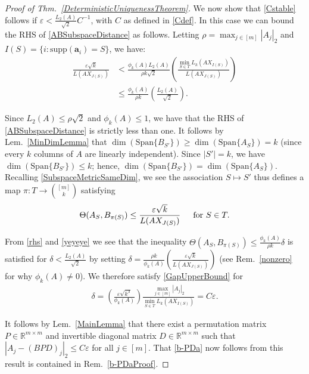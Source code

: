 \documentclass[journal, twocolumn]{IEEEtran}
\begin{document}
\begin{proof}[Proof of Thm.~\ref{DeterministicUniquenessTheorem}]
We now show that \eqref{Cstable} follows if $\varepsilon < \frac{L_2(A)}{\sqrt{2}}C^{-1}$, with $C$ as defined in \eqref{Cdef}. In this case we can bound the RHS of \eqref {ABSubspaceDistance} as follows. Letting $\rho = \max_{j \in [m]} |A_j|_2$ and $I(S) = \{i: \text{supp}(\mathbf{a}_i)=S\}$, we have:
\begin{align}\label{rhs}
\frac{\varepsilon\sqrt{k}}{L(AX_{J(S)})} 
&<  \frac{\phi_k(A) L_2(A)}{\rho k \sqrt{2}} \left( \frac{\min_{S \in T}L_k(AX_{I(S)})}{L(AX_{J(S)})} \right) \nonumber \\
&\leq \frac{\phi_k(A)}{\rho k} \left( \frac{L_2(A)}{\sqrt{2}} \right).
\end{align}

Since $L_2(A) \leq \rho \sqrt{2}$ and $\phi_k(A) \leq 1$, we have that the RHS of \eqref{ABSubspaceDistance} is strictly less than one. It follows by Lem.~\ref{MinDimLemma} that $\dim(\text{Span}\{B_{S'}\}) \geq \dim(\text{Span}\{A_{S}\}) = k$ (since every $k$ columns of $A$ are linearly independent). Since $|S'| = k$, we have $\dim(\text{Span}\{B_{S'}\}) \leq k$; hence, $\dim(\text{Span}\{B_{S'}\}) = \dim(\text{Span}\{A_{S}\})$. Recalling \eqref{SubspaceMetricSameDim},  we see the association $S \mapsto S'$ thus defines a map $\pi: T \to {[m] \choose k}$ satisfying
\begin{align}\label{yeyeye}
\Theta(A_{S}, B_{\pi(S)}) \leq \frac{\varepsilon\sqrt{k}}{L(AX_{J(S)})} \indent \text{for } S \in T.
\end{align}

From \eqref{rhs} and \eqref{yeyeye} we see that the inequality $\Theta(A_{S}, B_{\pi(S)}) \leq \frac{ \phi_k(A) }{\rho k} \delta$ is satisfied for $\delta < \frac{L_2(A)}{\sqrt{2}}$ by setting $\delta = \frac{ \rho k}{ \phi_k(A) } \left(  \frac{\varepsilon \sqrt{k}}{L(AX_{J(S)})} \right)$ (see Rem.~\ref{nonzero} for why $\phi_k(A) \neq 0$). We therefore satisfy \eqref{GapUpperBound} for 
\begin{align*}
\delta = \left( \frac{ \varepsilon \sqrt{k^3}}{ \phi_k(A) } \right) \frac{\max_{j \in [m]} |A_j|_2}{\min_{S \in T} L_k(AX_{I(S)})}
= C\varepsilon.
\end{align*}

It follows by Lem.~\ref{MainLemma} that there exist a permutation matrix $P \in \mathbb{R}^{m \times m}$ and invertible diagonal matrix $D \in \mathbb{R}^{m \times m}$ such that $|A_j - (BPD)_j|_2 \leq C\varepsilon$ for all $j \in [m]$. That \eqref{b-PDa} now follows from this result is contained in Rem.~\ref{b-PDaProof}.
\end{proof}
\end{document}
